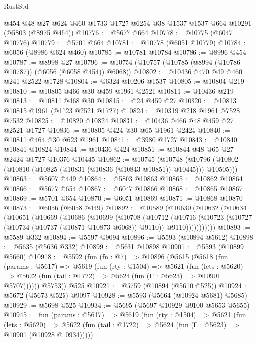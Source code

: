 \begin{lexlean}{RustStd}
\begin{coremodule}
    @454
    @48
    @27
    @624
    @460
    @1733
    @1727
    @6254
    @38
    @1537
    @1537
    @664
    @10291
    (@5803 (@8975 @454))
@10776 := @5677 @664
@10778 := @10775 (@6047 @10776)
@10779 := @5701 @664
@10781 := @10778 (@6051 @10779)
@10784 := @6056 (@8986 @624 @460)
@10785 := @10781 @10784
@10786 := @8996 @454
@10787 := @8998 @27
@10796 := @10754 (@10757 (@10785 (@8994 (@10786 @10787)) (@6056 (@6058 @454)) @6068))
@10802 := @10436 @470 @49 @460 @241 @2522 @1728
@10804 := @6324 @10206 @1537
@10805 := @10804 @219
@10810 := @10805 @466 @30 @459 @1961 @2521
@10811 := @10436 @219
@10813 := @10811 @468 @30
@10815 := @24 @459 @27
@10820 := @10813 @10815 @1961 (@1723 @2521 @1727)
@10824 := @10319 @218 @1961 @7528 @7532
@10825 := @10820 @10824
@10831 := @10436 @466 @48 @459 @27 @2521 @1727
@10836 := @10805 @424 @30 @65 @1961 @2424
@10840 := @10811 @464 @30 @623 @1961
@10841 := @3980 @1727
@10843 := @10840 @10841 @10824
@10844 := @10436 @424
@10851 := @10844 @48 @65 @27 @2424 @1727 @10376 @10445
@10862 := @10745
    (@10748 (@10796 (@10802 (@10810 (@10825 (@10831 (@10836 (@10843 @10851)) @10445))) @10505)))
@10863 := @5607 @449
@10864 := @5803 @10863
@10865 := @10862 @10864
@10866 := @5677 @654
@10867 := @6047 @10866
@10868 := @10865 @10867
@10869 := @5701 @654
@10870 := @6051 @10869
@10871 := @10868 @10870
@10873 := @6056 (@6058 @449)
@10892 := @10589
    (@10630
      (@10632
        (@10634
          (@10651
            (@10669
              (@10686
                (@10699
                  (@10708
                    (@10712
                      (@10716
                        (@10723
                          (@10727 (@10734 (@10737 (@10871 @10873 @6068)) @9110))
                          @9110)))))))))))
@10893 := @5589 @332
@10894 := @5597 @9094
@10896 := @5593 (@10894 @5612)
@10898 := @5635 (@5636 @332)
@10899 := @5631 @10898
@10901 := @5593 (@10899 @5660)
@10918 := @5592
    (fun (fn : @7) =>
    @10896
      (@5615
        (@5618
          (fun (params : @5617) =>
          @5619
            (fun (rty : @1504) =>
            @5621
              (fun (lets : @5620) =>
              @5622 (fun (tail : @1722) => @5624 (fun (Γ : @5623) => @10901 @5707))))))
        @5753))
    @525
@10921 := @5759 (@10894 (@5610 @525))
@10924 := @5672 (@5673 @525) @9097
@10928 := @5593 (@5664 (@10924 @5681) @5685)
@10929 := @5698 @525
@10934 := @5695 (@5697 @10929 @9100 @5653 @5655)
@10945 := fun (params : @5617) =>
  @5619
    (fun (rty : @1504) =>
    @5621
      (fun (lets : @5620) =>
      @5622 (fun (tail : @1722) => @5624 (fun (Γ : @5623) => @10901 (@10928 @10934)))))

\end{coremodule}
\end{lexlean}
